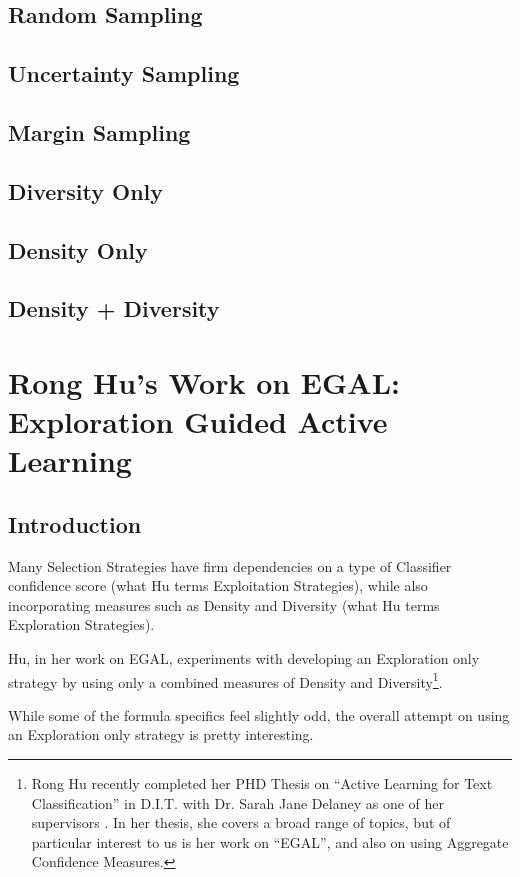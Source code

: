 \documentclass[a4paper,11pt]{report}
\begin{document}
\subsection{Random Sampling}
\subsection{Uncertainty Sampling}
\subsection{Margin Sampling}
\subsection{Diversity Only}
\subsection{Density Only}
\subsection{Density + Diversity}

\section{Rong Hu's Work on EGAL: Exploration Guided Active Learning}
\subsection{Introduction}
Many Selection Strategies have firm dependencies on a type of Classifier confidence score (what Hu terms Exploitation Strategies), while also incorporating measures such as Density and Diversity (what Hu terms Exploration Strategies).

Hu, in her work on EGAL, experiments with developing an Exploration only strategy by using only a combined measures of Density and Diversity\footnote{Rong Hu recently completed her PHD Thesis on ``Active Learning for Text Classification'' in D.I.T. with Dr. Sarah Jane Delaney as one of her supervisors \cite{Hu2011}. In her thesis, she covers a broad range of topics, but of particular interest to us is her work on ``EGAL'', and also on using Aggregate Confidence Measures.}.

While some of the formula specifics feel slightly odd, the overall attempt on using an Exploration only strategy is pretty interesting. 

\end{document}
